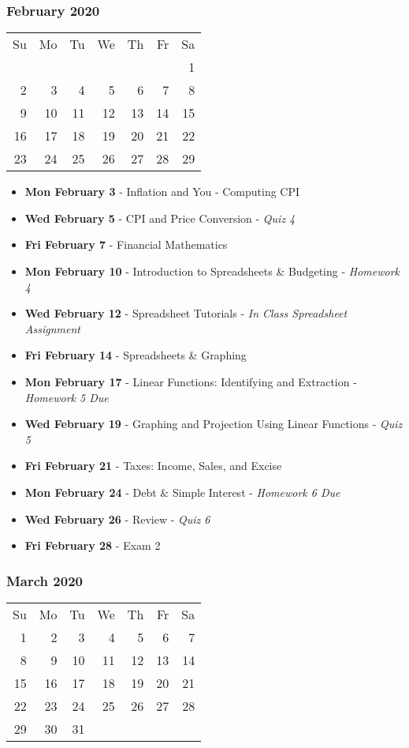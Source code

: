 \subsubsection*{February 2020}
\begin{tabular}{rrrrrrr}
Su & Mo & Tu & We & Th & Fr & Sa\\
   &    &    &    &    &    &  1\\ 
 2 &  3 &  4 &  5 &  6 &  7 &  8\\ 
 9 & 10 & 11 & 12 & 13 & 14 & 15\\ 
16 & 17 & 18 & 19 & 20 & 21 & 22\\ \cline{6-6}
23 & 24 & 25 & 26 & 27 & \multicolumn{1}{|r|}{28} & 29\\ \cline{6-6}
\end{tabular}
\begin{itemize}
\item\textbf{Mon February  3}
  - Inflation and You - Computing CPI
\item\textbf{Wed February  5}
  - CPI and Price Conversion - {\em Quiz 4}
\item\textbf{Fri February  7}
  - Financial Mathematics 
\item\textbf{Mon February 10}
  - Introduction to Spreadsheets \& Budgeting - {\em Homework 4}
\item\textbf{Wed February 12}
  - Spreadsheet Tutorials - {\em In Class Spreadsheet Assignment} 
\item\textbf{Fri February 14}
  - Spreadsheets \& Graphing  
\item\textbf{Mon February 17}
  - Linear Functions: Identifying and Extraction - {\em Homework 5 Due}
\item\textbf{Wed February 19}
  - Graphing and Projection Using Linear Functions - {\em Quiz 5} 
\item\textbf{Fri February 21}
  - Taxes: Income, Sales, and Excise 
\item\textbf{Mon February 24}
  - Debt \& Simple Interest  - {\em Homework 6 Due}
\item\textbf{Wed February 26}
  - Review - {\em Quiz 6}
\item\textbf{Fri February 28}
  - Exam 2 
\end{itemize}
\hrulefill

\subsubsection*{March 2020}
\begin{tabular}{rrrrrrr}
Su & Mo & Tu & We & Th & Fr & Sa\\
 1 &  2 &  3 &  4 &  5 &  6 &  7\\ 
 8 &  9 & 10 & 11 & 12 & 13 & 14\\ 
15 & 16 & 17 & 18 & 19 & 20 & 21\\ 
22 & 23 & 24 & 25 & 26 & 27 & 28\\
29 & 30 & 31 &    &    &    & \\
\end{tabular}

